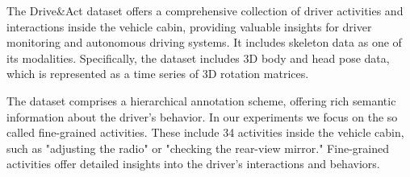 The Drive\&Act dataset offers a comprehensive collection of driver activities and interactions inside the vehicle cabin, providing valuable insights for driver monitoring and autonomous driving systems. 
It includes skeleton data as one of its modalities. Specifically, the dataset includes 3D body and head pose data, which is represented as a time series of 3D rotation matrices. 

The dataset comprises a hierarchical annotation scheme, offering rich semantic information about the driver's behavior. In our experiments we focus on the so called fine-grained activities. These include 34 activities inside the vehicle cabin, such as "adjusting the radio" or "checking the rear-view mirror." Fine-grained activities offer detailed insights into the driver's interactions and behaviors.



